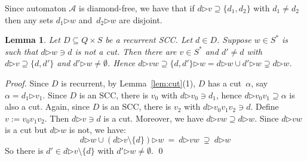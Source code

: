 \documentclass{elsarticle}
\newtheorem{lemma}[definition]{Lemma}
\def\cA{\mathcal{A}}
\newcommand{\then}{\mathord{\triangleright}}
\begin{document}
Since automaton $\cA$ is diamond-free, we have that if $d \then v \supseteq \{d_1, d_2\}$ with $d_1 \ne d_2$ then any sets $d_1 \then w$ and~$d_2 \then w$ are disjoint.
\begin{lemma} \label{lem:get-larger}
Let $D \subseteq Q \times S$ be a recurrent SCC.
Let $d \in D$.
Suppose $w \in S^*$ is such that $d \then w \ni d$ is not a cut.
Then there are $v \in S^*$ and $d' \ne d$ with $d \then v \supseteq \{d,d'\}$ and $d' \then w \ne \emptyset$.
Hence $d \then v w \supseteq \{d,d'\} \then w  = d \then w \cup d' \then w \supsetneq d \then w$.
\end{lemma}
\begin{proof}
Since $D$ is recurrent, by Lemma~\ref{lem:cut}(1), $D$ has a cut~$\alpha$, say $\alpha = d_1 \then v_1$.
Since $D$ is an SCC, there is $v_0$ with $d \then v_0 \ni d_1$, hence $d \then v_0 v_1 \supseteq \alpha$ is also a cut.
Again, since $D$ is an SCC, there is $v_2$ with $d \then v_0 v_1 v_2 \ni d$.
Define $v := v_0 v_1 v_2$.
Then $d \then v \ni d$ is a cut.
Moreover, we have $d \then v w \supseteq d \then w$.
Since $d \then v w$ is a cut but $d \then w$ is not, we have:
\[
 d \then w \cup (d \then v \setminus \{d\}) \then w \ = \ d \then v w \ \supsetneq \ d \then w
\]
So there is $d' \in d \then v \setminus \{d\}$ with $d' \then w \ne \emptyset$.
\qed
\end{proof}
\end{document}
